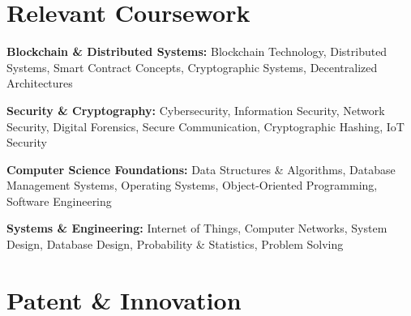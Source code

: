 \documentclass[a4paper,11pt]{article}
\begin{document}
\vspace{-10pt}

\section{Relevant Coursework}

\begin{itemize}[leftmargin=0in, label={}]

\small{

\item{
\textbf{Blockchain \& Distributed Systems:} Blockchain Technology, Distributed Systems, Smart Contract Concepts, Cryptographic Systems, Decentralized Architectures
}

\item{
\textbf{Security \& Cryptography:} Cybersecurity, Information Security, Network Security, Digital Forensics, Secure Communication, Cryptographic Hashing, IoT Security
}

\item{
\textbf{Computer Science Foundations:} Data Structures \& Algorithms, Database Management Systems, Operating Systems, Object-Oriented Programming, Software Engineering
}

\item{
\textbf{Systems \& Engineering:} Internet of Things, Computer Networks, System Design, Database Design, Probability \& Statistics, Problem Solving
}

}

\end{itemize}

\vspace{-10pt}


\section{Patent \& Innovation}
\end{document}
